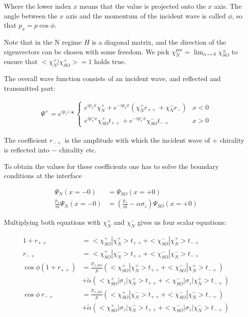\documentclass[11pt]{article}
\newcommand{\ta}{\tilde \alpha}
\begin{document}
Where the lower index $x$ means that the value is projected onto the
$x$ axis. The angle between the $x$ axis and the momentum of the
incident wave is called $\phi$, so that $p_x = p \cos \phi$.

Note that in the N regime $H$ is a diagonal matrix, and the direction
of the eigenvectors can be chosen with some freedom. We pick
$\chi_N^{pm} = \lim_{\alpha \mapsto 0} \chi_{SO}^{\pm}$ to ensure that
$<\chi_N^+|\chi_{SO}^+> = 1$ holds true.


The overall wave function consists of an incident wave, and reflected
and transmitted part:

\begin{align}
    \Psi^+ = e^{i p_z z} * \left\{
        \begin{array}{ll}
            e^{i p_x x} \chi_N^+ + e^{- i p_x x} (\chi_N^+ r_{++} +
                    \chi_N^- r_{-})     & x < 0\\
            e^{i p_x^+ x} \chi_{SO}^+ t_{++} + e^{-i p_x^- x}
            \chi_{SO}^- t_{-+}          & x > 0
        \end{array} \right.
\end{align}

The coefficient $r_{-+}$ is the amplitude with which the incident wave
of $+$ chirality is reflected into $-$ chirality etc.

To obtain the values for these coefficients one has to solve the
boundary conditions at the interface

\begin{align}
    \Psi_N(x = -0)              &= \Psi_{SO}(x = +0)\\
    \frac{p_x}{m} \Psi_N(x = -0)&= \left(\frac{p_x}{m} -\alpha \sigma_z\right)
                                        \Psi_{SO}(x = +0)
\end{align}

Multiplying both equations with $\chi_N^+$ and $\chi_N^-$ gives us
four scalar equations:

\begin{align} 
    \label{eq:a1}
    1 + r_{++}  &= <\chi_{SO}^+|\chi_N^+> t_{++} +
                    <\chi_{SO}^-|\chi_N^+> t_{-+}\\
    \label{eq:a2}
        r_{-+}  &= <\chi_{SO}^+|\chi_N^-> t_{++} + <\chi_{SO}^-|\chi_N^-> t_{-+}\\
    \label{eq:b1}
    \cos \phi  (1 + r_{++})
                &= \frac{p_{x,SO}}{p} \left(<\chi_{SO}^+|\chi_N^+> t_{++} 
                        + <\chi_{SO}^-|\chi_N^+> t_{-+} \right) \nonumber \\
                &  + \ta \left(<\chi_{SO}^+|\sigma_z|\chi_N^+> t_{++} 
                        + <\chi_{SO}^-|\sigma_z|\chi_N^+> t_{-+} \right)\\
 \label{eq:b2}
    \cos \phi \  r_{-+}
                &= \frac{p_{x,SO}}{p} \left(<\chi_{SO}^+|\chi_N^-> t_{++} 
                        + <\chi_{SO}^-|\chi_N^-> t_{-+} \right) \nonumber\\
                &  + \ta \left(<\chi_{SO}^+|\sigma_z|\chi_N^-> t_{++} 
                        + <\chi_{SO}^-|\sigma_z|\chi_N^-> t_{-+} \right)
\end{align}
\end{document}
